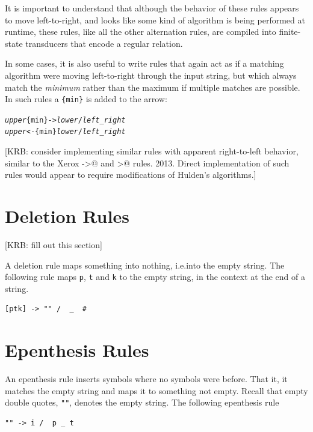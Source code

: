 It is important to understand that although the behavior of these rules appears to move
left-to-right, and looks like some kind of algorithm is being performed at runtime, these
rules, like all the other alternation rules, are compiled into finite-state transducers
that encode a regular relation.

In some cases, it is also useful to write rules that again act as if a matching algorithm
were moving left-to-right through the input string, but which always match the
\emph{minimum} rather than the maximum if multiple matches are possible.  In such rules a
\verb!{min}! is added to the arrow:

\begin{alltt}
\emph{upper} \{min\}-> \emph{lower} / \emph{left} _ \emph{right}
\emph{upper} <-\{min\} \emph{lower} / \emph{left} _ \emph{right}
\end{alltt}

[KRB:  consider implementing similar rules with apparent right-to-left
behavior, similar to the Xerox ->@ and >@ rules.  2013.  Direct
implementation of such rules would appear to require modifications of
Hulden's algorithms.]

\section{Deletion Rules}

[KRB:  fill out this section]

A deletion rule maps something into nothing, i.e.\@ into the empty string.  The
following rule maps \texttt{p}, \texttt{t} and \texttt{k} to the empty string, in
the context at the end of a string.


\begin{Verbatim}
[ptk] -> "" /  _  #
\end{Verbatim}


\section{Epenthesis Rules}

An epenthesis rule inserts symbols where no symbols were before.  That it, it matches the empty string and maps it to
something not empty.  Recall that empty double quotes, \verb!""!, denotes the empty string.  The following epenthesis rule

\begin{Verbatim}
"" -> i /  p _ t
\end{Verbatim}


